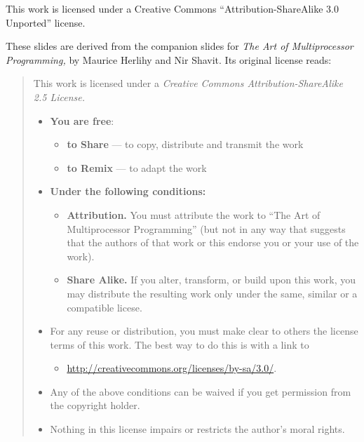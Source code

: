 \documentclass{beamer}
\begin{document}
\begin{frame}{}{}
\vskip4pt
\parskip=4pt
\scriptsize
This work is licensed under a Creative Commons “Attribution-ShareAlike
3.0 Unported” license.

These slides are derived from the companion slides for \emph{The Art of
Multiprocessor Programming,} by Maurice Herlihy and Nir Shavit. Its
original license reads:
\begin{quote}
  This work is licensed under a \emph{Creative Commons Attribution-ShareAlike
  2.5 License.}
\begin{itemize}
  \item \textbf{You are free}:
    \begin{itemize}
      \item\tiny \textbf{to Share} — to copy, distribute and transmit the work
        \item\tiny \textbf{to Remix} — to adapt the work
    \end{itemize}
  \item \textbf{Under the following conditions:}
    \begin{itemize}
      \item\tiny \textbf{Attribution.} You must attribute the work to “The Art of
        Multiprocessor Programming” (but not in any way that suggests
        that the authors of that work or this endorse you or your use of
        the work).
      \item\tiny \textbf{Share Alike.} If you alter, transform, or build upon this work,
        you may distribute the resulting work only under the same,
        similar or a compatible licese.
    \end{itemize}
  \item For any reuse or distribution, you must make clear to others the
    license terms of this work. The best way to do this is with a link to
    \begin{itemize}
      \item\tiny \url{http://creativecommons.org/licenses/by-sa/3.0/}.
    \end{itemize}
  \item Any of the above conditions can be waived if you get permission from
    the copyright holder.
  \item Nothing in this license impairs or restricts the author’s moral
    rights.
\end{itemize}
\end{quote}
\end{frame}
\end{document}
